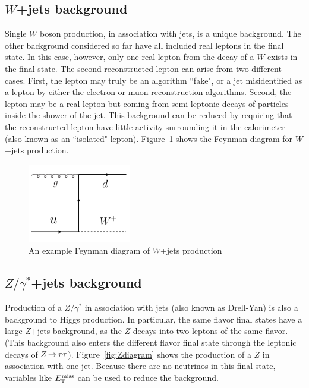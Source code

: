\subsection{$W$+jets background}

Single $W$ boson production, in association with jets, is a unique background. The other background considered so far have all included real leptons in the final state. In this case, however, only one real lepton from the decay of a $W$ exists in the final state. The second reconstructed lepton can arise from two different cases. First, the lepton may truly be an algorithm ``fake", or a jet misidentified as a lepton by either the electron or muon reconstruction algorithms. Second, the lepton may be a real lepton but coming from semi-leptonic decays of particles inside the shower of the jet. This background can be reduced by requiring that the reconstructed lepton have little activity surrounding it in the calorimeter (also known as an ``isolated" lepton). Figure~\ref{fig:Wdiagram} shows the Feynman diagram for $W$+jets production. 


\begin{figure}[h!]
  \centering
  \captionsetup{justification=centering}

  \includegraphics[width=0.4\textwidth]{figures/Feyn_W}
  \caption{An example Feynman diagram of $W$+jets production}
  \label{fig:Wdiagram}
\end{figure}

\subsection{$Z/\gamma^{*}$+jets background}

Production of a $Z/\gamma^{*}$  in association with jets (also known as Drell-Yan) is also a background to Higgs production. In particular, the same flavor final states have a large $Z$+jets background, as the $Z$ decays into two leptons of the same flavor. (This background also enters the different flavor final state through the leptonic decays of $Z\,{\rightarrow}\,\tau\tau$). Figure~\ref{fig:Zdiagram} shows the production of a $Z$ in association with one jet. Because there are no neutrinos in this final state, variables like $E_{\textrm{\footnotesize\sc t}}^{\rm miss}$ can be used to reduce the background. 

